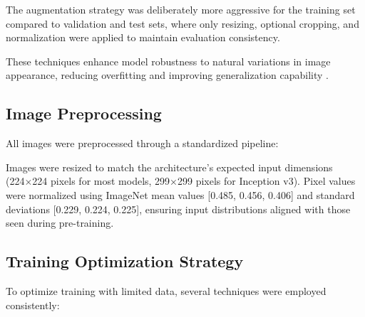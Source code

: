 \documentclass[a4paper,12pt]{report}
\begin{document}
The augmentation strategy was deliberately more aggressive for the training set compared to validation and test sets, where only resizing, optional cropping, and normalization were applied to maintain evaluation consistency.

These techniques enhance model robustness to natural variations in image appearance, reducing overfitting and improving generalization capability \citep{perez2017effectivenessdataaugmentationimage}.

\subsection{Image Preprocessing}

All images were preprocessed through a standardized pipeline:

Images were resized to match the architecture's expected input dimensions (224×224 pixels for most models, 299×299 pixels for Inception v3). Pixel values were normalized using ImageNet mean values [0.485, 0.456, 0.406] and standard deviations [0.229, 0.224, 0.225], ensuring input distributions aligned with those seen during pre-training.


\subsection{Training Optimization Strategy}

To optimize training with limited data, several techniques were employed consistently:
\end{document}
